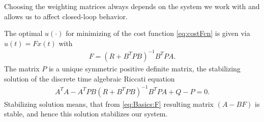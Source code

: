 Choosing the weighting matrices always depends on the system we work with and allows us to affect closed-loop behavior.   

The optimal $u(\cdot)$ for minimizing of the cost function \eqref{eq:costFcn} is given via $u(t) = F x(t)$ with
\begin{align}
\label{eq:Basics:F}
F = (R + B^T P B)^{-1}B^TPA.
\end{align}
The matrix $P$ is a unique symmetric positive definite matrix, the stabilizing solution of the discrete time algebraic Riccati equation
\begin{align}
 A^TA - A^T P B (R + B^T P B)^{-1} B^T P A + Q - P = 0.%
\end{align}
Stabilizing solution means, that from \eqref{eq:Basics:F} resulting matrix $(A - BF)$ is stable, and hence this solution stabilizes our system. 




 




%
%
%

